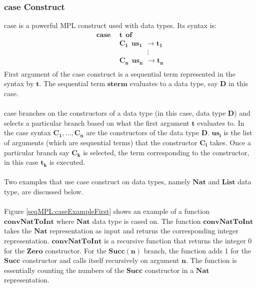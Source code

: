 \documentclass[11pt]{article}
\begin{document}
\subsubsection {case Construct}\label{SeqMPL:caseConstruct}
{\sf case} is a powerful MPL construct used with data types. Its syntax is:
\begin{align*}
      \mathbf{case~~}&\mathbf{t~~ of}\\
      &\mathbf{C_1~~us_1~~\to t_1} \\
      &\mathbf{\qquad\qquad \vdots} \\
      &\mathbf{C_n~~us_n~~\to t_n}\\
\end{align*}
First argument of the {\sf case} construct is a sequential term represented in the syntax by $\mathbf {t}$. The sequential term $\mathbf {sterm}$ evaluates to a data type, say $\mathbf {D}$ in this case.
~~\\~~\\
{\sf case} branches on the constructors of a data type (in this case, data type $\mathbf {D}$) and selects a particular branch based on what the first argument $\mathbf {t}$ evaluates to. In the {\sf case} syntax $\mathbf{C_1,\ldots,C_n}$ are the constructors of the data type $\mathbf {D}$. $\mathbf {us_i}$ is the list of arguments (which are sequential terms) that the constructor $\mathbf {C_i}$ takes. Once a particular branch say $\mathbf {C_k}$ is selected, the term corresponding to the constructor, in this case $\mathbf {t_k}$ is executed.
~~\\~~\\
Two examples that use {\sf case} construct on data types, namely $\mathbf {Nat}$ and $\mathbf {List}$ data type, are discussed below.
~~\\~~\\ 
Figure \ref{seqMPL:caseExampleFirst} shows an example of a function $\mathbf{convNatToInt}$ where $\mathbf{Nat}$ data type is cased on. The function $\mathbf{convNatToInt}$ takes the $\mathbf{Nat}$ representation as input and returns the corresponding integer representation. $\mathbf{convNatToInt}$ is a recursive function that returns the integer 0 for the  $\mathbf{Zero}$ constructor. For the $\mathbf{Succ(n)}$ branch, the function adds 1 for the  $\mathbf{Succ}$ constructor and calls itself recursively on argument $\mathbf{n}$. The function is essentially counting the numbers of the $\mathbf{Succ}$ constructor in a $\mathbf{Nat}$ representation.
~~\\~~\\
\end{document}
